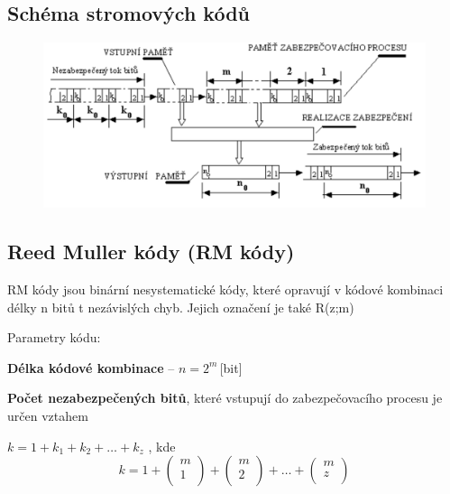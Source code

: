 \vspace{2cm}

\subsection{Schéma stromových kódů}

\begin{figure}[h]
    \centering
    \includegraphics[width=\textwidth]{images/042.png}
\end{figure}

\subsection{Reed Muller kódy (RM kódy)}

RM kódy jsou binární nesystematické kódy, které opravují v kódové kombinaci délky n bitů t nezávislých chyb.
Jejich označení je také R(z;m)

Parametry kódu:

\textbf{Délka kódové kombinace} -- $n = 2^m$\,[bit]

\textbf{Počet nezabezpečených bitů}, které vstupují do zabezpečovacího procesu je určen vztahem 

$k = 1 + k_1 + k_2 + \dots + k_z$ , kde
\[
k=1 +
\begin{pmatrix}
    m \\
    1 \\
\end{pmatrix}
+
\begin{pmatrix}
    m \\
    2 \\
\end{pmatrix}
+
\dots
+
\begin{pmatrix}
    m \\
    z \\
\end{pmatrix}
\]

